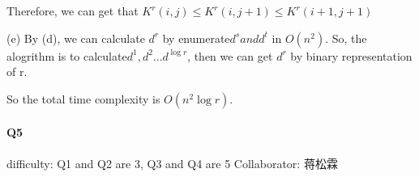 \documentclass[UTF8]{ctexart}
\renewcommand{\(}{\left(}
\renewcommand{\)}{\right)}
\begin{document}
Therefore, we can get that $K^{r}(i,j) \leq K^{r}(i,j+1) \leq K^{r}(i+1,j+1)$

(e) By (d), we can calculate $d^{r}$ by enumerate$d^{s} and d^{t}$ in $O(n^2)$.
So, the alogrithm is to calculate$d^{1}, d^{2}...d^{\log{r}}$, then we can get $d^{r}$ by binary representation of r.

So the total time complexity is $O(n^{2}\log{r})$.

\paragraph{Q5}

difficulty: Q1 and Q2 are 3, Q3 and Q4 are 5
Collaborator: 蒋松霖
\end{document}
